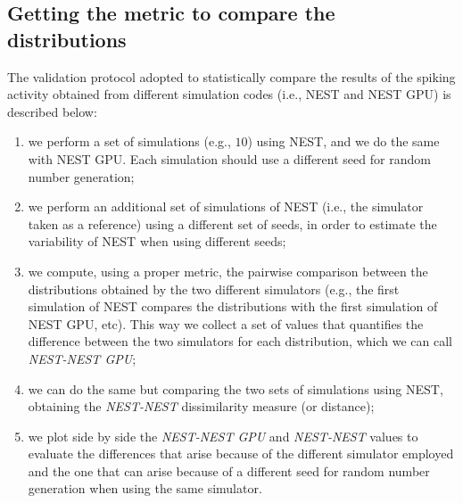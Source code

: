 \documentclass[a4paper, 12pt, twoside, openright]{book}
\begin{document}
\subsection{Getting the metric to compare the distributions}
\label{sed:validation_protocol}
The validation protocol adopted to statistically compare the results of the spiking activity obtained from different simulation codes (i.e., NEST and NEST GPU) is described below:
\begin{enumerate}
    \item we perform a set of simulations (e.g., $10$) using NEST, and we do the same with NEST GPU. Each simulation should use a different seed for random number generation;
    \item we perform an additional set of simulations of NEST (i.e., the simulator taken as a reference) using a different set of seeds, in order to estimate the variability of NEST when using different seeds;
    \item we compute, using a proper metric, the pairwise comparison between the distributions obtained by the two different simulators (e.g., the first simulation of NEST compares the distributions with the first simulation of NEST GPU, etc). This way we collect a set of values that quantifies the difference between the two simulators for each distribution, which we can call \textit{NEST-NEST GPU};
    \item we can do the same but comparing the two sets of simulations using NEST, obtaining the \textit{NEST-NEST} dissimilarity measure (or distance);
    \item we plot side by side the \textit{NEST-NEST GPU} and \textit{NEST-NEST} values to evaluate the differences that arise because of the different simulator employed and the one that can arise because of a different seed for random number generation when using the same simulator.
\end{enumerate}
\end{document}
